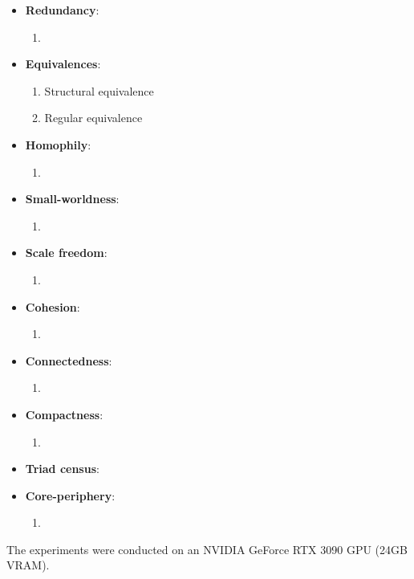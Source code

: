 \documentclass[12pt, a4paper]{article}
\begin{document}
\begin{itemize}
\begin{enumerate}
			\end{enumerate}
		\item \textbf{Redundancy}:
			\begin{enumerate}
				\item 
			\end{enumerate}
		\item \textbf{Equivalences}:
			\begin{enumerate}
				\item Structural equivalence
				\item Regular equivalence
			\end{enumerate}
		\item \textbf{Homophily}:
			\begin{enumerate}
				\item 	
			\end{enumerate}
		\item \textbf{Small-worldness}:
			\begin{enumerate}
				\item 	
			\end{enumerate}
		\item \textbf{Scale freedom}:
			\begin{enumerate}
				\item 	
			\end{enumerate}
		\item \textbf{Cohesion}:
			\begin{enumerate}
				\item 	
			\end{enumerate}
		\item \textbf{Connectedness}:
			\begin{enumerate}
				\item 	
			\end{enumerate}
		\item \textbf{Compactness}:
			\begin{enumerate}
				\item 	
			\end{enumerate}
		\item \textbf{Triad census}:
			
		\item \textbf{Core-periphery}:
			\begin{enumerate}
				\item 	
			\end{enumerate}
	\end{itemize}
	The experiments were conducted on an NVIDIA GeForce RTX 3090 GPU (24GB VRAM).\\
\end{document}
